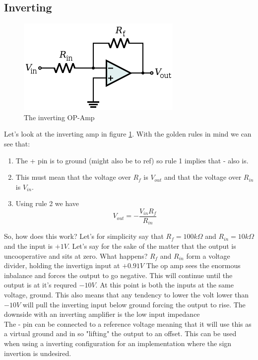 \documentclass[12pt,a4paper]{article}
\begin{document}
    \subsection{Inverting}

    \begin{figure}[!h]
      \begin{center}
        \includegraphics[scale=0.5]{InvOpAmp}
        \caption{The inverting OP-Amp}
        \label{fig:InvOpAmp}
      \end{center}
    \end{figure}
    Let's look at the inverting amp in figure \ref{fig:InvOpAmp}. With the
    golden rules in mind we can see that:
    \begin{enumerate}
    \item The + pin is to ground (might also be to ref) so rule 1
      implies that - also is.
    \item This must mean that the voltage over $R_f$ is $V_{out}$ and
      that the voltage over $R_{in}$ is $V_{in}$.
    \item Using rule 2 we have 
      \begin{equation}
        V_{out}=-\frac{V_{in}R_f}{R_{in}}
      \end{equation}
    \end{enumerate}
    So, how does this work? Let's for simplicity say that
    $R_f=100k\Omega$ and $R_{in}=10k\Omega$ and the input is $+1V$.
    Let's say for the sake of the matter that the output is
    uncooperative and sits at zero. What happens? $R_f$ and $R_{in}$
    form a voltage divider, holding the invertign input at $+0.91V$ The
    op amp sees the enormous inbalance and forces the output to go
    negative. This will continue until the output is at it's requred
    $-10V$. At this point is both the inputs at the same voltage,
    ground. This also means that any tendency to lower the volt lower
    than $-10V$ will pull the inverting input below ground forcing the
    output to rise. The downside with an inverting amplifier is the low
    input impedance
    \\ The - pin can be connected to a reference voltage meaning that it
    will use this as a virtual ground and in so "lifting" the output
    to an offset. This can be used when using a inverting configuration
    for an implementation where the sign invertion is undesired.
\end{document}

